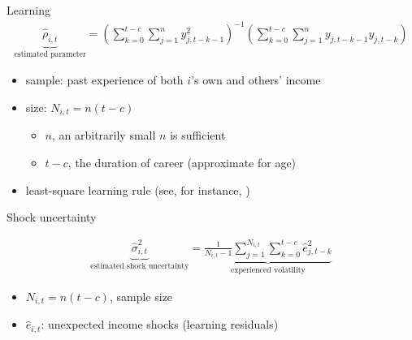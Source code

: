 \documentclass{beamer}
\begin{document}
\begin{frame}{Learning}
\begin{eqnarray}
\underbrace{\hat \rho_{i,t}}_{\text{estimated parameter}}= (\sum^{t-c}_{k=0}\sum^{n}_{j=1}y^2_{j,t-k-1})^{-1}(\sum^{t-c}_{k=0}\sum^{n}_{j=1}y_{j,t-k-1}y_{j,t-k})
\end{eqnarray}

	\begin{itemize}
		\item sample: past experience of both $i$'s own and others' income
		\item size:   $N_{i,t} = n (t-c)$
		\begin{itemize}
		\item $n$, an arbitrarily small $n$ is sufficient
		 \item $t-c$, the duration of career (approximate for age)   
		 \end{itemize}
		\item least-square learning rule (see, for instance, \cite{evans2012learning})
	\end{itemize} 
\end{frame}

\begin{frame}{Shock uncertainty}
	
	
\begin{eqnarray}
\underbrace{\widehat{\sigma}^2_{i,t}}_{\text{estimated shock uncertainty}}=  \underbrace{\frac{1}{N_{i,t}-1} \sum^{N_{i,t}}_{j=1}\sum^{t-c}_{k=0} \hat e_{j,t-k}^2}_{\text{experienced volatility}}
\end{eqnarray}

	\begin{itemize}
	\item $N_{i,t} = n (t-c)$, sample size
	\item $\hat e_{i,t}$: unexpected income shocks (learning residuals)
\end{itemize} 
\end{frame}
\end{document}
